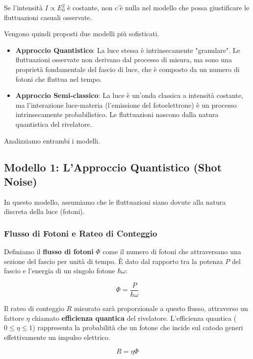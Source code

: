 Se l'intensità $I \propto E_0^2$ è costante, non c'è nulla nel modello che possa giustificare le fluttuazioni casuali osservate.

Vengono quindi proposti due modelli più sofisticati.
\begin{itemize}
    \item \textbf{Approccio Quantistico}: La luce stessa è intrinsecamente "granulare". Le fluttuazioni osservate non derivano dal processo di misura, ma sono una proprietà fondamentale del fascio di luce, che è composto da un numero di fotoni che fluttua nel tempo.
    \item \textbf{Approccio Semi-classico}: La luce è un'onda classica a intensità costante, ma l'interazione luce-materia (l'emissione del fotoelettrone) è un processo intrinsecamente probabilistico. Le fluttuazioni nascono dalla natura quantistica del rivelatore.
\end{itemize}
Analizziamo entrambi i modelli.

\subsection{Modello 1: L'Approccio Quantistico (Shot Noise)}

In questo modello, assumiamo che le fluttuazioni siano dovute alla natura discreta della luce (fotoni).

\subsubsection*{Flusso di Fotoni e Rateo di Conteggio}
Definiamo il \textbf{flusso di fotoni} $\Phi$ come il numero di fotoni che attraversano una sezione del fascio per unità di tempo. È dato dal rapporto tra la potenza $P$ del fascio e l'energia di un singolo fotone $\hbar\omega$:

\begin{equation}
 \Phi = \frac{P}{\hbar\omega}
\end{equation}

Il rateo di conteggio $R$ misurato sarà proporzionale a questo flusso, attraverso un fattore $\eta$ chiamato \textbf{efficienza quantica} del rivelatore. L'efficienza quantica ($0 \le \eta \le 1$) rappresenta la probabilità che un fotone che incide sul catodo generi effettivamente un impulso elettrico.

\begin{equation}
 R = \eta \Phi
\end{equation}

